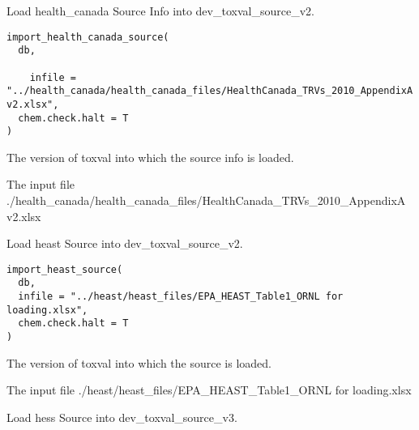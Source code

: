 \documentclass[letterpaper]{book}
\begin{document}
%
\begin{Description}\relax
Load health\_canada Source Info into dev\_toxval\_source\_v2.
\end{Description}
%
\begin{Usage}
\begin{verbatim}
import_health_canada_source(
  db,
 
    infile = "../health_canada/health_canada_files/HealthCanada_TRVs_2010_AppendixA v2.xlsx",
  chem.check.halt = T
)
\end{verbatim}
\end{Usage}
%
\begin{Arguments}
\begin{ldescription}
\item[\code{db}] The version of toxval into which the source info is loaded.

\item[\code{infile}] The input file ./health\_canada/health\_canada\_files/HealthCanada\_TRVs\_2010\_AppendixA v2.xlsx
\end{ldescription}
\end{Arguments}
%
\begin{Description}\relax
Load heast Source into dev\_toxval\_source\_v2.
\end{Description}
%
\begin{Usage}
\begin{verbatim}
import_heast_source(
  db,
  infile = "../heast/heast_files/EPA_HEAST_Table1_ORNL for loading.xlsx",
  chem.check.halt = T
)
\end{verbatim}
\end{Usage}
%
\begin{Arguments}
\begin{ldescription}
\item[\code{db}] The version of toxval into which the source is loaded.

\item[\code{infile}] The input file ./heast/heast\_files/EPA\_HEAST\_Table1\_ORNL for loading.xlsx
\end{ldescription}
\end{Arguments}
%
\begin{Description}\relax
Load hess Source into dev\_toxval\_source\_v3.
\end{Description}
\end{document}

